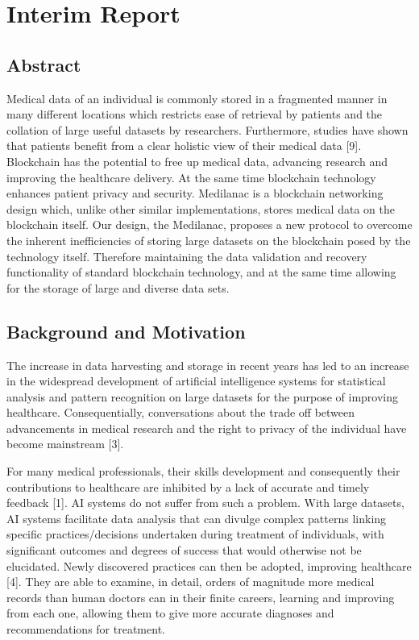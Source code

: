 \documentclass[]{article}
\date{}
\begin{document}
\hypertarget{header-n0}{%
\section{Interim Report}\label{header-n0}}

\hypertarget{header-n2}{%
\subsection{Abstract}\label{header-n2}}

Medical data of an individual is commonly stored in a fragmented manner
in many different locations which restricts ease of retrieval by
patients and the collation of large useful datasets by researchers.
Furthermore, studies have shown that patients benefit from a clear
holistic view of their medical data {[}9{]}. Blockchain has the
potential to free up medical data, advancing research and improving the
healthcare delivery. At the same time blockchain technology enhances
patient privacy and security. Medilanac is a blockchain networking
design which, unlike other similar implementations, stores medical data
on the blockchain itself. Our design, the Medilanac, proposes a new
protocol to overcome the inherent inefficiencies of storing large
datasets on the blockchain posed by the technology itself. Therefore
maintaining the data validation and recovery functionality of standard
blockchain technology, and at the same time allowing for the storage of
large and diverse data sets.

\hypertarget{header-n4}{%
\subsection{Background and Motivation}\label{header-n4}}

The increase in data harvesting and storage in recent years has led to
an increase in the widespread development of artificial intelligence
systems for statistical analysis and pattern recognition on large
datasets for the purpose of improving healthcare. Consequentially,
conversations about the trade off between advancements in medical
research and the right to privacy of the individual have become
mainstream {[}3{]}.

For many medical professionals, their skills development and
consequently their contributions to healthcare are inhibited by a lack
of accurate and timely feedback {[}1{]}. AI systems do not suffer from
such a problem. With large datasets, AI systems facilitate data analysis
that can divulge complex patterns linking specific practices/decisions
undertaken during treatment of individuals, with significant outcomes
and degrees of success that would otherwise not be elucidated. Newly
discovered practices can then be adopted, improving healthcare {[}4{]}.
They are able to examine, in detail, orders of magnitude more medical
records than human doctors can in their finite careers, learning and
improving from each one, allowing them to give more accurate diagnoses
and recommendations for treatment.
\end{document}
